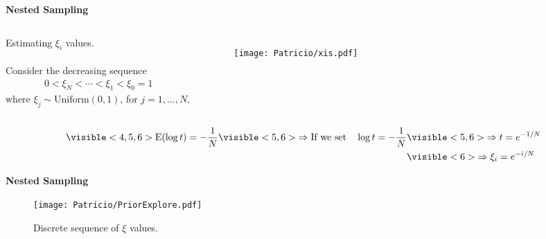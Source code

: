 \begin{frame}{\small{\textbf{Nested Sampling}}}
\begin{columns}[T]
Estimating $\xi_{i}$ values.\\~\\
Consider the decreasing sequence
\begin{align*}
0<\xi_{N}<\cdots<\xi_{1}<\xi_{0}=1
\end{align*}
where $\xi_{j}\sim\text{Uniform}(0,1)$, for $j=1,\ldots,N,$ 
\begin{figure}
   \texttt{[image: Patricio/xis.pdf]}
\end{figure}
\end{columns}
\begin{align*}
\visible<4,5,6>{\text{E}(\log t) = -\frac{1}{N}} 
\visible<5,6>{\Rightarrow \text{If we set}\quad \log t = -\frac{1}{N}}&\visible<5,6>{\Rightarrow t = e^{-1/N}}\\
&\visible<6>{\Rightarrow \xi_{i}= e^{-i/N}}
\end{align*}
\end{frame}
\begin{frame}{\small{\textbf{Nested Sampling}}}
\begin{figure}[]    		
		\texttt{[image: Patricio/PriorExplore.pdf]}
		\caption{Discrete sequence of $\xi$ values.}
\end{figure}
\end{frame}
